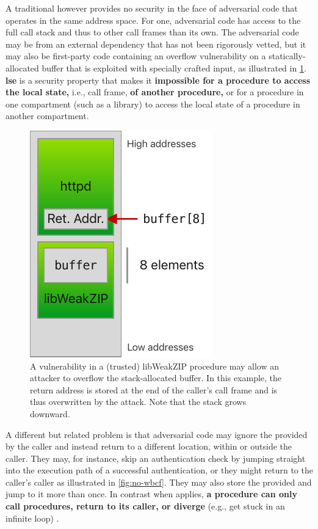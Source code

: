 \documentclass[main.tex]{subfiles}
\begin{document}
A traditional  however provides no security in the face of adversarial code that operates in the same address space. For one, adversarial code has access to the full call stack and thus to other call frames than its own. The adversarial code may be from an external dependency that has not been rigorously vetted, but it may also be first-party code containing an overflow vulnerability on a statically-allocated buffer that is exploited with specially crafted input, as illustrated in \cref{fig:buffoverflow}. \textbf{\Gls{lse}} is a security property that makes it \textbf{impossible for a procedure to access the local state,} i.e., call frame, \textbf{of another procedure,} \citep[Section~1]{stktokens} or for a procedure in one compartment (such as a library) to access the local state of a procedure in another compartment.

\begin{figure}
	\centering
	\includegraphics{Images/Buffer Overflow.pdf}
	\caption{A vulnerability in a (trusted) libWeakZIP procedure may allow an attacker to overflow the stack-allocated buffer. In this example, the return address is stored at the end of the caller's call frame and is thus overwritten by the attack. Note that the stack grows downward.}
	\label{fig:buffoverflow}
\end{figure}

A different but related problem is that adversarial code may ignore the  provided by the caller and instead return to a different location, within or outside the caller. They may, for instance, skip an authentication check by jumping straight into the execution path of a successful authentication, or they might return to the caller's caller as illustrated in \cref{fig:no-wbcf}. They may also store the provided  and jump to it more than once. In contrast when \textbf{} applies, \textbf{a procedure can only call procedures, return to its caller, or diverge} (e.g., get stuck in an infinite loop) \citep[Section~1]{stktokens}.
\end{document}
